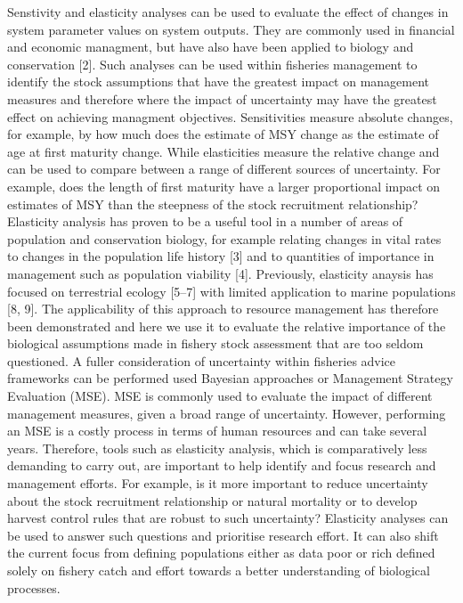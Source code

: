 \documentclass[%
nonumbib,      %
%
]{nrc1}                          %
\begin{document}
Senstivity and elasticity analyses can be used to evaluate the eﬀect of changes in system parameter values on system outputs. They are commonly used in financial and economic managment, but have also have been applied to biology and conservation [2]. Such analyses can be used within fisheries management to identify the stock assumptions that have the greatest impact on management measures and therefore where the impact of uncertainty may have the greatest eﬀect on achieving managment objectives. Sensitivities measure absolute changes, for example, by how much does the estimate of MSY change as the estimate of age at first maturity change. While elasticities measure the relative change and can be used to compare between a range of diﬀerent sources of uncertainty. For example, does the length of first maturity have a larger proportional impact on estimates of MSY than the steepness of the stock recruitment relationship? Elasticity analysis has proven to be a useful tool in a number of areas of population and conservation biology, for example relating changes in vital rates to changes in the population life history [3] and to quantities of importance in management such as population viability [4]. Previously, elasticity anaysis has focused on terrestrial ecology [5–7] with limited application to marine populations [8, 9]. The applicability of this approach to resource management has therefore been demonstrated and here we use it to evaluate the relative importance of the biological assumptions made in fishery stock assessment that are too seldom questioned. 
A fuller consideration of uncertainty within fisheries advice frameworks can be performed used Bayesian approaches or Management Strategy Evaluation (MSE). MSE is commonly used to evaluate the impact of diﬀerent management measures, given a broad range of uncertainty. However, performing an MSE is a costly process in terms of human resources and can take several years. Therefore, tools such as elasticity analysis, which is comparatively less demanding to carry out, are important to help identify and focus research and management eﬀorts. For example, is it more important to reduce uncertainty about the stock recruitment relationship or natural mortality or to develop harvest control rules that are robust to such uncertainty? Elasticity analyses can be used to answer such questions and prioritise research eﬀort. It can also shift the current focus from defining populations either as data poor or rich defined solely on fishery catch and eﬀort towards a better understanding of biological processes. 
\end{document}
